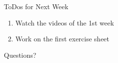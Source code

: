 \documentclass[aspectratio=169]{../latex_main/tntbeamer}  %
\begin{document}
\begin{frame}[c]{ToDos for Next Week}


\begin{enumerate}
    \item Watch the videos of the \alert{1st week}
    \item Work on the first exercise sheet
\end{enumerate}

\end{frame}


\begin{frame}[c]{}

\centering
\huge
Questions?

\end{frame}

	
\end{document}
